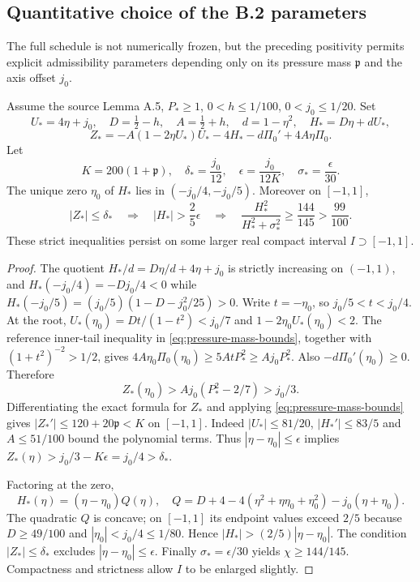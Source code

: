 \subsection*{Quantitative choice of the B.2 parameters}
The full schedule is not numerically frozen, but the preceding
positivity permits explicit admissibility parameters depending
only on its pressure mass $\mathfrak p$ and the axis offset $j_0$.

\begin{proposition}
\label{prop:constructive-B2}
Assume the source Lemma A.5, $P_*\ge1$,
$0<h\le1/100$, $0<j_0\le1/20$. Set
\[
 U_*=4\eta+j_0,\quad D=\tfrac12-h,\quad
 A=\tfrac12+h,\quad d=1-\eta^2,\quad
 H_*=D\eta+dU_*,
\]
\[
 Z_*=-A(1-2\eta U_*)U_*-4H_*-d\Pi_0'
       +4A\eta\Pi_0.
\]
Let
\begin{equation}\label{eq:constructive-B2-parameters}
 K=200(1+\mathfrak p),\quad
 \delta_*=\frac{j_0}{12},\quad
 \epsilon=\frac{j_0}{12K},\quad
 \sigma_*=\frac{\epsilon}{30}.
\end{equation}
The unique zero $\eta_0$ of $H_*$ lies in
$(-j_0/4,-j_0/5)$. Moreover on $[-1,1]$,
\begin{equation}\label{eq:B2-certified}
 |Z_*|\le\delta_*
 \quad\Longrightarrow\quad |H_*|>\frac25\epsilon
 \quad\Longrightarrow\quad
 \frac{H_*^2}{H_*^2+\sigma_*^2}\ge\frac{144}{145}
 >\frac{99}{100}.
\end{equation}
These strict inequalities persist on some larger real compact
interval $I\supset[-1,1]$.
\end{proposition}
\begin{proof}
The quotient $H_*/d=D\eta/d+4\eta+j_0$
is strictly increasing on $(-1,1)$, and
$H_*(-j_0/4)=-Dj_0/4<0$ while
$H_*(-j_0/5)=(j_0/5)(1-D-j_0^2/25)>0$.
Write $t=-\eta_0$, so $j_0/5<t<j_0/4$.
At the root, $U_*(\eta_0)=Dt/(1-t^2)<j_0/7$
and $1-2\eta_0U_*(\eta_0)<2$.
The reference inner-tail inequality in
\eqref{eq:pressure-mass-bounds}, together with
$(1+t^2)^{-2}>1/2$, gives
$4A\eta_0\Pi_0(\eta_0)\ge5AtP_*^2\ge Aj_0P_*^2$.
Also $-d\Pi_0'(\eta_0)\ge0$. Therefore
\begin{equation}\label{eq:Z-root-positive}
 Z_*(\eta_0)>Aj_0(P_*^2-2/7)>j_0/3.
\end{equation}
Differentiating the exact formula for $Z_*$ and applying
\eqref{eq:pressure-mass-bounds} gives
$|Z_*'|\le120+20\mathfrak p<K$ on $[-1,1]$.
Indeed $|U_*|\le81/20$, $|H_*'|\le83/5$ and
$A\le51/100$ bound the polynomial terms.
Thus $|\eta-\eta_0|\le\epsilon$ implies
$Z_*(\eta)>j_0/3-K\epsilon=j_0/4>\delta_*$.

Factoring at the zero,
\[
 H_*(\eta)=(\eta-\eta_0)Q(\eta),\quad
 Q=D+4-4(\eta^2+\eta\eta_0+\eta_0^2)
      -j_0(\eta+\eta_0).
\]
The quadratic $Q$ is concave; on $[-1,1]$ its endpoint
values exceed $2/5$ because $D\ge49/100$ and
$|\eta_0|<j_0/4\le1/80$. Hence
$|H_*|>(2/5)|\eta-\eta_0|$. The condition
$|Z_*|\le\delta_*$ excludes $|\eta-\eta_0|\le\epsilon$.
Finally $\sigma_*=\epsilon/30$ yields $\chi\ge144/145$.
Compactness and strictness allow $I$ to be enlarged slightly.
\end{proof}

